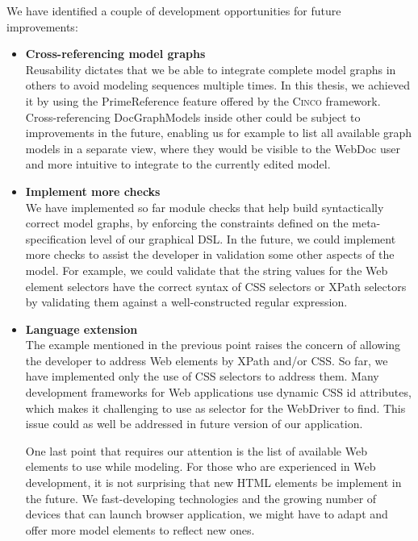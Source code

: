 We have identified a couple of development opportunities for future improvements:
\begin{itemize}
    \item \textbf{Cross-referencing model graphs}\\
        Reusability dictates that we be able to integrate complete model graphs in others to avoid modeling sequences multiple times. In this thesis, we achieved it by using the PrimeReference feature offered by the \textsc{Cinco} framework. Cross-referencing DocGraphModels inside other could be subject to improvements in the future, enabling us for example to list all available graph models in a separate view, where they would be visible to the WebDoc user and more intuitive to integrate to the currently edited model.
    \item \textbf{Implement more checks}\\
        We have implemented so far module checks that help build syntactically correct model graphs, by enforcing the constraints defined on the meta-specification level of our graphical DSL. In the future, we could implement more checks to assist the developer in validation some other aspects of the model. For example, we could validate that the string values for the Web element selectors have the correct syntax of CSS selectors or XPath selectors by validating them against a well-constructed regular expression.
    \item \textbf{Language extension}\\
        The example mentioned in the previous point raises the concern of allowing the developer to address Web elements by XPath and/or CSS. So far, we have implemented only the use of CSS selectors to address them. Many development frameworks for Web applications use dynamic CSS id attributes, which makes it challenging to use as selector for the WebDriver to find. This issue could as well be addressed in future version of our application.

        One last point that requires our attention is the list of available Web elements to use while modeling. For those who are experienced in Web development, it is not surprising that new HTML elements be implement in the future. We fast-developing technologies and the growing number of devices that can launch browser application, we might have to adapt and offer more model elements to reflect new ones.


\end{itemize}
